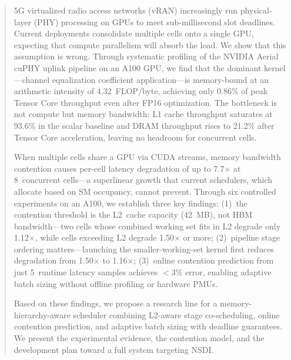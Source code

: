 \begin{abstract}
5G virtualized radio access networks (vRAN) increasingly run physical-layer (PHY) processing on GPUs to meet sub-millisecond slot deadlines. Current deployments consolidate multiple cells onto a single GPU, expecting that compute parallelism will absorb the load. We show that this assumption is wrong. Through systematic profiling of the NVIDIA Aerial cuPHY uplink pipeline on an A100 GPU, we find that the dominant kernel---channel equalization coefficient application---is memory-bound at an arithmetic intensity of 4.32~FLOP/byte, achieving only 0.86\% of peak Tensor Core throughput even after FP16 optimization. The bottleneck is not compute but memory bandwidth: L1 cache throughput saturates at 93.6\% in the scalar baseline and DRAM throughput rises to 21.2\% after Tensor Core acceleration, leaving no headroom for concurrent cells.

When multiple cells share a GPU via CUDA streams, memory bandwidth contention causes per-cell latency degradation of up to 7.7$\times$ at 8~concurrent cells---a superlinear growth that current schedulers, which allocate based on SM occupancy, cannot prevent. Through six controlled experiments on an A100, we establish three key findings: (1)~the contention threshold is the L2~cache capacity (42~MB), not HBM bandwidth---two cells whose combined working set fits in L2 degrade only 1.12$\times$, while cells exceeding L2 degrade 1.50$\times$ or more; (2)~pipeline stage ordering matters---launching the smaller-working-set kernel first reduces degradation from 1.50$\times$ to 1.16$\times$; (3)~online contention prediction from just 5~runtime latency samples achieves $<$3\% error, enabling adaptive batch sizing without offline profiling or hardware PMUs.

Based on these findings, we propose a research line for a memory-hierarchy-aware scheduler combining L2-aware stage co-scheduling, online contention prediction, and adaptive batch sizing with deadline guarantees. We present the experimental evidence, the contention model, and the development plan toward a full system targeting NSDI.
\end{abstract}
